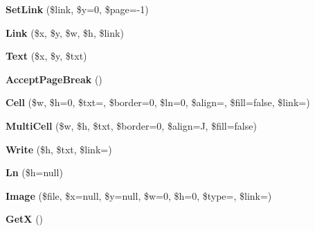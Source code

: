 \begin{DoxyCompactItemize}
\item 
\hypertarget{classFPDF_ab0137580cd5c01b4a48f4aec276706d4}{}{\bfseries Set\+Link} (\$link, \$y=0, \$page=-\/1)\label{classFPDF_ab0137580cd5c01b4a48f4aec276706d4}

\item 
\hypertarget{classFPDF_a50de51eae9ed1dab3a448491fcbbdde5}{}{\bfseries Link} (\$x, \$y, \$w, \$h, \$link)\label{classFPDF_a50de51eae9ed1dab3a448491fcbbdde5}

\item 
\hypertarget{classFPDF_af3354d9f93d576837fba5b157a1a7e37}{}{\bfseries Text} (\$x, \$y, \$txt)\label{classFPDF_af3354d9f93d576837fba5b157a1a7e37}

\item 
\hypertarget{classFPDF_acb406647f47041ae06ec01324e6a2377}{}{\bfseries Accept\+Page\+Break} ()\label{classFPDF_acb406647f47041ae06ec01324e6a2377}

\item 
\hypertarget{classFPDF_a37c88a6a7daf937b3dd88a903ccbfa64}{}{\bfseries Cell} (\$w, \$h=0, \$txt=\textquotesingle{}\textquotesingle{}, \$border=0, \$ln=0, \$align=\textquotesingle{}\textquotesingle{}, \$fill=false, \$link=\textquotesingle{}\textquotesingle{})\label{classFPDF_a37c88a6a7daf937b3dd88a903ccbfa64}

\item 
\hypertarget{classFPDF_aaa047bd8692257bb2962d5d65c090319}{}{\bfseries Multi\+Cell} (\$w, \$h, \$txt, \$border=0, \$align=\textquotesingle{}J\textquotesingle{}, \$fill=false)\label{classFPDF_aaa047bd8692257bb2962d5d65c090319}

\item 
\hypertarget{classFPDF_a75beddaabec9e3d2b8939bd46f99e615}{}{\bfseries Write} (\$h, \$txt, \$link=\textquotesingle{}\textquotesingle{})\label{classFPDF_a75beddaabec9e3d2b8939bd46f99e615}

\item 
\hypertarget{classFPDF_a445e0364c7fa330c415495bb31f5651c}{}{\bfseries Ln} (\$h=null)\label{classFPDF_a445e0364c7fa330c415495bb31f5651c}

\item 
\hypertarget{classFPDF_a680c80cc244b5636db22994cf1b27a68}{}{\bfseries Image} (\$file, \$x=null, \$y=null, \$w=0, \$h=0, \$type=\textquotesingle{}\textquotesingle{}, \$link=\textquotesingle{}\textquotesingle{})\label{classFPDF_a680c80cc244b5636db22994cf1b27a68}

\item 
\hypertarget{classFPDF_a8b7bbc6309142f76ec2a78815f2f700f}{}{\bfseries Get\+X} ()\label{classFPDF_a8b7bbc6309142f76ec2a78815f2f700f}


\end{DoxyCompactItemize}
